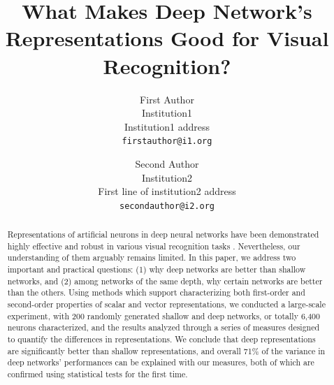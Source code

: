 \documentclass[10pt,twocolumn,letterpaper]{article}
\begin{document}
\title{What Makes Deep Network's Representations Good for Visual Recognition?}

\author{First Author\\
Institution1\\
Institution1 address\\
{\tt\small firstauthor@i1.org}
\and
Second Author\\
Institution2\\
First line of institution2 address\\
{\tt\small secondauthor@i2.org}
}

\maketitle

\begin{abstract}

Representations of artificial neurons in deep neural networks have been demonstrated highly effective and robust in various visual recognition tasks \cite{krizhevsky2012imagenet, sermanet2013overfeat, donahue2014decaf}.
Nevertheless, our understanding of them arguably remains limited.
In this paper, we address two important and practical questions: (1) why deep networks are better than shallow networks, and (2) among networks of the same depth, why certain networks are better than the others.
Using methods which support characterizing both first-order and second-order properties of scalar and vector representations, we conducted a large-scale experiment, with 200 randomly generated shallow and deep networks, or totally 6,400 neurons characterized, and the results analyzed through a series of measures designed to quantify the differences in representations. 
We conclude that deep representations are significantly better than shallow representations, and overall 71\% of the variance in deep networks' performances can be explained with our measures, both of which are confirmed using statistical tests for the first time.


\end{abstract}
\end{document}
